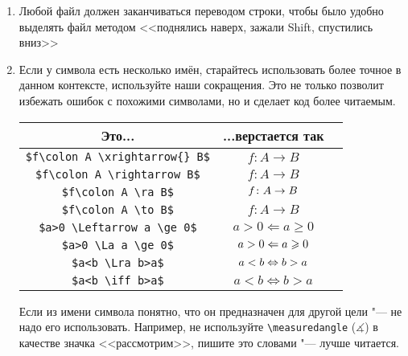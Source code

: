\begin{enumerate}
\item
	Любой файл должен заканчиваться переводом строки, чтобы было удобно выделять файл
	методом <<поднялись наверх, зажали Shift, спустились вниз>>

\item
	Если у символа есть несколько имён, старайтесь использовать более точное в данном контексте,
	используйте наши сокращения.
	Это не только позволит избежать ошибок с похожими символами, но и сделает код более читаемым.
	\begin{center}\begin{tabular}{|c|c|c|}
		\hline Это... & ...верстается так & \\
		\hline \verb'$f\colon A \xrightarrow{} B$' & $f\colon A \xrightarrow{} B$ \bad \\
		\hline \verb'$f\colon A \rightarrow B$' & $f\colon A \rightarrow B$ \bad \\
		\hline \verb'$f\colon A \ra B$' & $f\colon A \rightarrow B$ \bad \\
		\hline \verb'$f\colon A \to B$' & $f\colon A \to B$ \ok \\
		\hline \verb'$a>0 \Leftarrow a \ge 0$' & $a>0 \Leftarrow a \ge 0$ \bad \\
		\hline \verb'$a>0 \La a \ge 0$' & $a>0 \Leftarrow a \geqslant 0$ \ok \\
		\hline \verb'$a<b \Lra b>a$' & $a<b \Leftrightarrow b>a$ \bad \\
		\hline \verb'$a<b \iff b>a$' & $a<b \iff b>a$ \ok \\
		\hline
	\end{tabular}\end{center}
	Если из имени символа понятно, что он предназначен для другой цели "--- не надо его использовать.
	Например, не используйте \verb'\measuredangle' ($\measuredangle$) в качестве значка <<рассмотрим>>,
	пишите это словами "--- лучше читается.

\end{enumerate}

